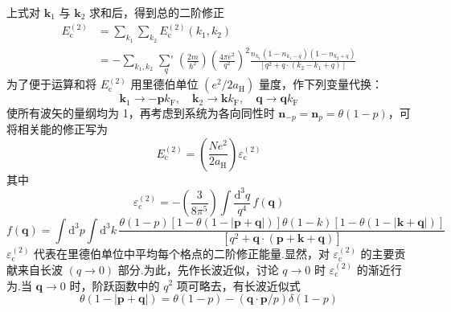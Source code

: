 上式对 $\boldsymbol{k}_{1}$ 与 $\boldsymbol{k}_{2}$ 求和后，得到总的二阶修正
\begin{equation}
\begin{aligned}
  E_{\mathrm{c}}^{(2)}&=\sum_{k_{1}}\sum_{k_{2}}E_{\mathrm{c}}^{(2)}\left(k_{1},k_{2}\right)\\
  &=-\sum_{k_{1},k_{2}}\mathop{{\sum}'}\limits_{q}
  \left(\frac{2m}{\hbar^{2}}\right)\left(\frac{4\pi e^{2}}{q^{2}}\right)^{2}
  \frac{n_{k_{1}}\left(1-n_{k_{1}-q}\right)\left(1-n_{k_{2}+q}\right)}
  {\left[q^{2}+q\cdot\left(k_{2}-k_{1}+q\right)\right]}
\end{aligned}
\end{equation}
为了便于运算和将 $E_{\mathrm{c}}^{(2)}$ 用里德伯单位 $\left(e^{2}/2a_{\mathrm{H}}\right)$ 量度，作下列变量代换：
\begin{equation}
  \boldsymbol{k}_{1}\to-\boldsymbol{p}k_{\mathrm{F}},\quad
  \boldsymbol{k}_{2}\to\boldsymbol{k}k_{\mathrm{F}},\quad
  \boldsymbol{q}\to\boldsymbol{q}k_{\mathrm{F}}
\end{equation}
使所有波矢的量纲均为 1，再考虑到系统为各向同性时 $\boldsymbol{n}_{-p}=\boldsymbol{n}_{p}=\theta\left(1-p\right)$，可将相关能的修正写为
\begin{equation}
  E_{\mathrm{c}}^{(2)}=\left(\frac{Ne^{2}}{2a_{\mathrm{H}}}\right)
  \varepsilon_{\mathrm{c}}^{(2)}
\end{equation}
其中
\begin{equation}
  \varepsilon_{\mathrm{c}}^{(2)}=-\left(\frac{3}{8\pi^{5}}\right)
  \int\frac{\mathrm{d}^{3}q}{q^{4}}\,f(\boldsymbol{q})
\end{equation}
\begin{equation}
  f(\boldsymbol{q})=\int\mathrm{d}^{3}p\int\mathrm{d}^{3}k\,
  \frac{\theta\left(1-p\right)\left[1-\theta\left(1-|\boldsymbol{p}+\boldsymbol{q}|\right)\right]
  \theta\left(1-k\right)\left[1-\theta\left(1-|\boldsymbol{k}+\boldsymbol{q}|\right)\right]}
  {\left[q^{2}+\boldsymbol{q}\cdot\left(\boldsymbol{p}+\boldsymbol{k}+\boldsymbol{q}\right)\right]}
\end{equation}
$\varepsilon_{\mathrm{c}}^{(2)}$ 代表在里德伯单位中平均每个格点的二阶修正能量.显然，对 $\varepsilon_{\mathrm{c}}^{(2)}$ 的主要贡献来自长波 $(q\to 0)$ 部分.为此，先作长波近似，讨论 $q\to 0$ 时 $\varepsilon_{\mathrm{c}}^{(2)}$ 的渐近行为.当 $\boldsymbol{q}\to 0$ 时，阶跃函数中的 $q^{2}$ 项可略去，有长波近似式
\begin{equation}
  \theta\left(1-|\boldsymbol{p}+\boldsymbol{q}|\right)=\theta\left(1-p\right)
  -\left(\boldsymbol{q}\cdot\boldsymbol{p}/p\right)\delta\left(1-p\right)
\end{equation}
